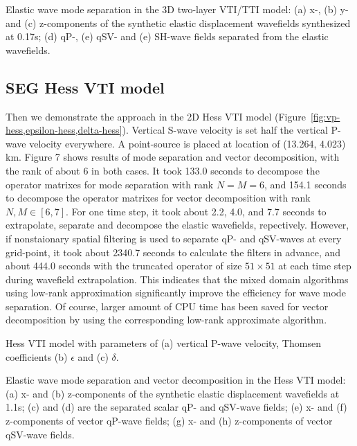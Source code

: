 {
Elastic wave mode separation in the 3D two-layer VTI/TTI model:
(a) x-, (b) y- and (c) z-components of the synthetic elastic displacement wavefields synthesized at 0.17s;
(d) qP-, (e) qSV- and (e) SH-wave fields separated from the elastic wavefields.
}

\subsection{SEG Hess VTI model}

Then we demonstrate the approach in the 2D Hess VTI model (Figure~\ref{fig:vp-hess,epsilon-hess,delta-hess}).
Vertical S-wave velocity is set  half the vertical P-wave velocity everywhere. A point-source is placed
 at  location of (13.264, 4.023) km.
Figure 7 shows results of mode separation and vector decomposition, with the rank of about $6$ in both cases.
It took 133.0 seconds to decompose the operator matrixes for mode separation with rank $N=M=6$, and 154.1 seconds to decompose the operator matrixes for vector decomposition with rank $N, M\in[6,7]$.
For one time step, it took about 2.2, 4.0, and 7.7 seconds to extrapolate, separate and decompose the elastic wavefields, repectively.
However, if nonstaionary spatial filtering is used to separate qP- and qSV-waves at every grid-point, it took about 2340.7 seconds
to calculate the filters in advance, and about 444.0 seconds with the truncated operator of size $51\times51$ 
at each time step during wavefield extrapolation.
 This indicates that the mixed domain algorithms using low-rank approximation significantly improve the efficiency for wave mode separation.
Of course, larger amount of CPU time has been saved for vector decomposition by using the corresponding low-rank approximate algorithm.

{
Hess VTI model with parameters of (a) vertical P-wave velocity, Thomsen coefficients (b) $\epsilon$ and (c) $\delta$.
}

{
Elastic wave mode separation and vector decomposition in the Hess VTI model:
(a) x- and (b) z-components of the synthetic elastic displacement wavefields at 1.1s;
(c) and (d) are the separated scalar qP- and qSV-wave fields;
(e) x- and (f) z-components of vector qP-wave fields;
(g) x- and (h) z-components of vector qSV-wave fields.
} 

